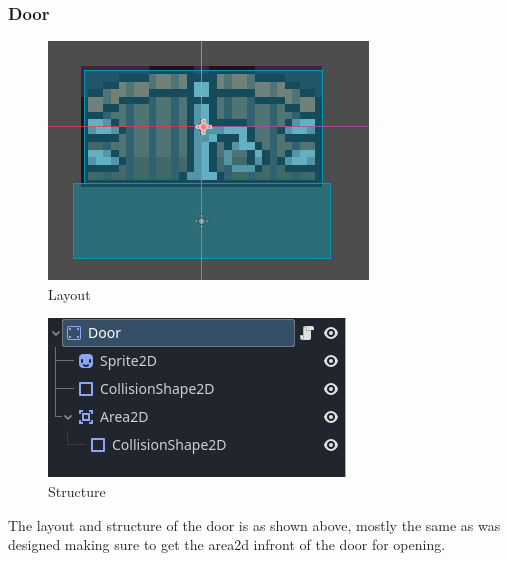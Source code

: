 \documentclass{article}
\begin{document}
        \subsubsection{Door}
        \begin{multicols}{2}
                \begin{figure}[H]
                        \centering
                        \includegraphics[width = 0.9\columnwidth]{images/development/Door_layout.PNG}
                        \caption{Layout}
                \end{figure}
                \begin{figure}[H]
                        \centering
                        \includegraphics[width = 0.9\columnwidth]{images/development/Door_structure.PNG}
                        \caption{Structure}
                \end{figure}   
        \end{multicols}
        \noindent The layout and structure of the door is as shown above, mostly the same as was designed making sure to get the area2d infront of the door for opening.\\
\end{document}

